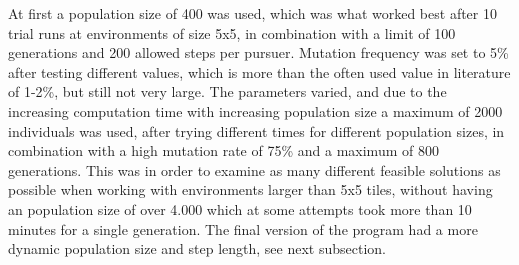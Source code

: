 At first a population size of 400 was used, which was what worked best after 10 trial runs at environments of size 5x5, in combination with a limit of 100 generations and 200 allowed steps per pursuer. Mutation frequency was set to 5\% after testing different values, which is more than the often used value in literature \cite{GAHandbook2} of 1-2\%, but still not very large. The parameters varied, and due to the increasing computation time with increasing population size a maximum of 2000 individuals was used, after trying different times for different population sizes, in combination with a high mutation rate of 75\% and a maximum of 800 generations. This was in order to examine as many different feasible solutions as possible when working with environments larger than 5x5 tiles, without having an population size of over 4.000 which at some attempts took more than 10 minutes for a single generation. The final version of the program had a more dynamic population size and step length, see next subsection.
